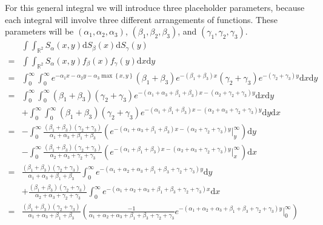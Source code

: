 For this general integral we will introduce three placeholder parameters, because each integral will involve three different arrangements of functions. These parameters will be $\left(\alpha_1,\alpha_2,\alpha_3\right)$, $\left(\beta_1,\beta_2,\beta_3\right)$, and $\left(\gamma_1,\gamma_2,\gamma_3\right)$.
\begin{align*}
    &\int\int_{\mathbb{R}^2}S_{\alpha}\left(x,y\right)\mathrm{d}S_{\beta}\left(x\right)\mathrm{d}S_{\gamma}\left(y\right)\\
    =&\int\int_{\mathbb{R}^2}S_{\alpha}\left(x,y\right)f_{\beta}\left(x\right)f_{\gamma}\left(y\right)\mathrm{d}x\mathrm{d}y\\
    =&\int_0^{\infty}\int_0^{\infty}e^{-\alpha_1x-\alpha_2y-\alpha_3\max\left\{x,y\right\}}\left(\beta_1+\beta_3\right)e^{-\left(\beta_1+\beta_3\right)x}\left(\gamma_2+\gamma_3\right)e^{-\left(\gamma_2+\gamma_3\right)y}\mathrm{d}x\mathrm{d}y\\
    =&\int_0^{\infty}\int_0^{\infty}\left(\beta_1+\beta_3\right)\left(\gamma_2+\gamma_3\right)e^{-\left(\alpha_1+\alpha_3+\beta_1+\beta_3\right)x-\left(\alpha_2+\gamma_2+\gamma_3\right)y}\mathrm{d}x\mathrm{d}y\\
    &+\int_0^{\infty}\int_0^{\infty}\left(\beta_1+\beta_3\right)\left(\gamma_2+\gamma_3\right)e^{-\left(\alpha_1+\beta_1+\beta_3\right)x-\left(\alpha_2+\alpha_3+\gamma_2+\gamma_3\right)y}\mathrm{d}y\mathrm{d}x\\
    =&-\int_0^{\infty}\frac{\left(\beta_1+\beta_3\right)\left(\gamma_2+\gamma_3\right)}{\alpha_1+\alpha_3+\beta_1+\beta_3}\left(e^{-\left(\alpha_1+\alpha_3+\beta_1+\beta_3\right)x-\left(\alpha_2+\gamma_2+\gamma_3\right)y}\bigg|_y^{\infty}\right)\mathrm{d}y\\
    &-\int_0^{\infty}\frac{\left(\beta_1+\beta_3\right)\left(\gamma_2+\gamma_3\right)}{\alpha_2+\alpha_3+\gamma_2+\gamma_3}\left(e^{-\left(\alpha_1+\beta_1+\beta_3\right)x-\left(\alpha_2+\alpha_3+\gamma_2+\gamma_3\right)y}\bigg|_x^{\infty}\right)\mathrm{d}x\\
    =&\frac{\left(\beta_1+\beta_3\right)\left(\gamma_2+\gamma_3\right)}{\alpha_1+\alpha_3+\beta_1+\beta_3}\int_0^{\infty}e^{-\left(\alpha_1+\alpha_2+\alpha_3+\beta_1+\beta_3+\gamma_2+\gamma_3\right)y}\mathrm{d}y\\
    &+\frac{\left(\beta_1+\beta_3\right)\left(\gamma_2+\gamma_3\right)}{\alpha_2+\alpha_3+\gamma_2+\gamma_3}\int_0^{\infty}e^{-\left(\alpha_1+\alpha_2+\alpha_3+\beta_1+\beta_3+\gamma_2+\gamma_3\right)x}\mathrm{d}x\\
    =&\frac{\left(\beta_1+\beta_3\right)\left(\gamma_2+\gamma_3\right)}{\alpha_1+\alpha_3+\beta_1+\beta_3}\left(\frac{-1}{\alpha_1+\alpha_2+\alpha_3+\beta_1+\beta_3+\gamma_2+\gamma_3}e^{-\left(\alpha_1+\alpha_2+\alpha_3+\beta_1+\beta_3+\gamma_2+\gamma_3\right)y}\bigg|_0^{\infty}\right)\\

\end{align*}
